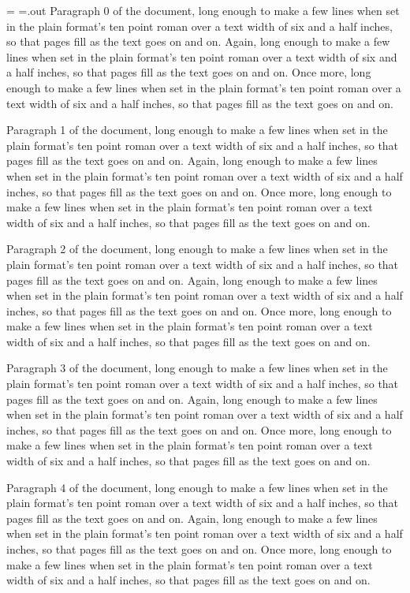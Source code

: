 \headline={\hfil\topmark\hfil}
=\jobname.out
Paragraph 0 of the document, long enough to make a few lines when set in the plain format's ten point roman over a text width of six and a half inches, so that pages fill as the text goes on and on. Again, long enough to make a few lines when set in the plain format's ten point roman over a text width of six and a half inches, so that pages fill as the text goes on and on. Once more, long enough to make a few lines when set in the plain format's ten point roman over a text width of six and a half inches, so that pages fill as the text goes on and on.

Paragraph 1 of the document, long enough to make a few lines when set in the plain format's ten point roman over a text width of six and a half inches, so that pages fill as the text goes on and on. Again, long enough to make a few lines when set in the plain format's ten point roman over a text width of six and a half inches, so that pages fill as the text goes on and on. Once more, long enough to make a few lines when set in the plain format's ten point roman over a text width of six and a half inches, so that pages fill as the text goes on and on.

Paragraph 2 of the document, long enough to make a few lines when set in the plain format's ten point roman over a text width of six and a half inches, so that pages fill as the text goes on and on. Again, long enough to make a few lines when set in the plain format's ten point roman over a text width of six and a half inches, so that pages fill as the text goes on and on. Once more, long enough to make a few lines when set in the plain format's ten point roman over a text width of six and a half inches, so that pages fill as the text goes on and on.

Paragraph 3 of the document, long enough to make a few lines when set in the plain format's ten point roman over a text width of six and a half inches, so that pages fill as the text goes on and on. Again, long enough to make a few lines when set in the plain format's ten point roman over a text width of six and a half inches, so that pages fill as the text goes on and on. Once more, long enough to make a few lines when set in the plain format's ten point roman over a text width of six and a half inches, so that pages fill as the text goes on and on.

Paragraph 4 of the document, long enough to make a few lines when set in the plain format's ten point roman over a text width of six and a half inches, so that pages fill as the text goes on and on. Again, long enough to make a few lines when set in the plain format's ten point roman over a text width of six and a half inches, so that pages fill as the text goes on and on. Once more, long enough to make a few lines when set in the plain format's ten point roman over a text width of six and a half inches, so that pages fill as the text goes on and on.

